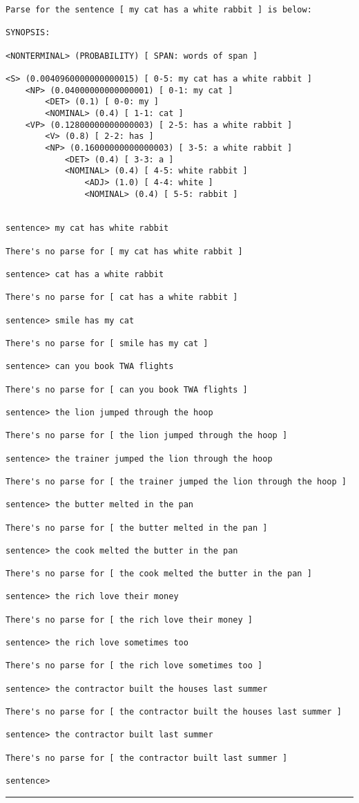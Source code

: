 \begin{verbatim}
Parse for the sentence [ my cat has a white rabbit ] is below:

SYNOPSIS:

<NONTERMINAL> (PROBABILITY) [ SPAN: words of span ]

<S> (0.0040960000000000015) [ 0-5: my cat has a white rabbit ]
    <NP> (0.04000000000000001) [ 0-1: my cat ]
        <DET> (0.1) [ 0-0: my ]
        <NOMINAL> (0.4) [ 1-1: cat ]
    <VP> (0.12800000000000003) [ 2-5: has a white rabbit ]
        <V> (0.8) [ 2-2: has ]
        <NP> (0.16000000000000003) [ 3-5: a white rabbit ]
            <DET> (0.4) [ 3-3: a ]
            <NOMINAL> (0.4) [ 4-5: white rabbit ]
                <ADJ> (1.0) [ 4-4: white ]
                <NOMINAL> (0.4) [ 5-5: rabbit ]


sentence> my cat has white rabbit

There's no parse for [ my cat has white rabbit ]

sentence> cat has a white rabbit

There's no parse for [ cat has a white rabbit ]

sentence> smile has my cat

There's no parse for [ smile has my cat ]

sentence> can you book TWA flights

There's no parse for [ can you book TWA flights ]

sentence> the lion jumped through the hoop

There's no parse for [ the lion jumped through the hoop ]

sentence> the trainer jumped the lion through the hoop

There's no parse for [ the trainer jumped the lion through the hoop ]

sentence> the butter melted in the pan

There's no parse for [ the butter melted in the pan ]

sentence> the cook melted the butter in the pan

There's no parse for [ the cook melted the butter in the pan ]

sentence> the rich love their money

There's no parse for [ the rich love their money ]

sentence> the rich love sometimes too

There's no parse for [ the rich love sometimes too ]

sentence> the contractor built the houses last summer

There's no parse for [ the contractor built the houses last summer ]

sentence> the contractor built last summer

There's no parse for [ the contractor built last summer ]

sentence>
\end{verbatim}
\vskip4pt\hrule

